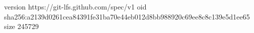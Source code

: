 version https://git-lfs.github.com/spec/v1
oid sha256:a2139d0261cea84391fe31ba70e44eb012d8bb988920c69ee8c8c139e5d1ee65
size 245729
